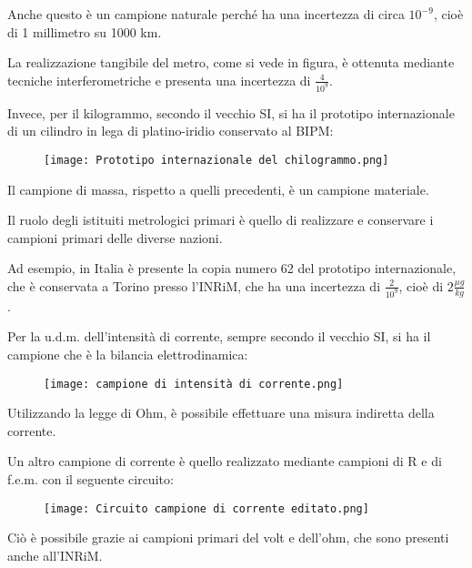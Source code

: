 Anche questo è un campione naturale perché ha una incertezza di circa $10^{-9}$, 
cioè di 1 millimetro su 1000 km. \newline 

La realizzazione tangibile del metro, come si vede in figura, è ottenuta mediante tecniche interferometriche e presenta una incertezza 
di $\frac{4}{10^{9}}$. \newline 

Invece, per il kilogrammo, secondo il vecchio SI, si ha il prototipo internazionale di un cilindro in lega di platino-iridio conservato al BIPM: 

\begin{figure}[h]
    \centering
    \texttt{[image: Prototipo internazionale del chilogrammo.png]}
\end{figure}

Il campione di massa, rispetto a quelli precedenti, è un campione materiale. \newline 

Il ruolo degli istituiti metrologici primari è quello di realizzare e conservare i campioni primari delle diverse nazioni. \newline 

Ad esempio, in Italia è presente la copia numero 62 del prototipo internazionale, che è conservata a Torino presso l'INRiM, 
che ha una incertezza di $\frac{2}{10^{9}}$, cioè di $2\frac{ \mu g}{kg}$. \newline 

Per la u.d.m. dell'intensità di corrente, sempre secondo il vecchio SI, si ha il campione che è la bilancia elettrodinamica: 

\begin{figure}[h]
    \centering
    \texttt{[image: campione di intensità di corrente.png]}
\end{figure}

\newpage 

Utilizzando la legge di Ohm, è possibile effettuare una misura indiretta della corrente. \newline 

Un altro campione di corrente è quello realizzato mediante campioni di R e di f.e.m.  con il seguente circuito: 

\begin{figure}[h]
    \centering
    \texttt{[image: Circuito campione di corrente editato.png]}
\end{figure}

Ciò è possibile grazie ai campioni primari del volt e dell'ohm, che sono presenti anche all'INRiM. \newline 

